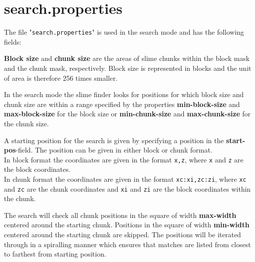 \documentclass[12pt]{article}
\begin{document}
\pagebreak
\section{\textbf{search.properties}}
\label{search.properties}
The file "\texttt{search.properties}" is used in the search mode and has the following fields:

\hspace{1.0cm}

\textbf{Block size} and \textbf{chunk size} are the areas of slime chunks within the block mask and the chunk mask, respectively. Block size is represented in blocks and the unit of area is therefore 256 times smaller.

In the search mode the slime finder looks for positions for which block size and chunk size are within a range specified by the properties \textbf{min-block-size} and \textbf{max-block-size} for the block size or \textbf{min-chunk-size} and \textbf{max-chunk-size} for the chunk size.

A starting position for the search is given by specifying a position in the \textbf{start-pos}-field. The position can be given in either block or chunk format. \\
In block format the coordinates are given in the format \texttt{x,z}, where \texttt{x} and \texttt{z} are the block coordinates. \\
In chunk format the coordinates are given in the format \texttt{xc:xi,zc:zi}, where \texttt{xc} and \texttt{zc} are the chunk coordinates and \texttt{xi} and \texttt{zi} are the block coordinates within the chunk.

The search will check all chunk positions in the square of width \textbf{max-width} centered around the starting chunk. Positions in the square of width \textbf{min-width} centered around the starting chunk are skipped.
The positions will be iterated through in a spiralling manner which ensures that matches are listed from closest to farthest from starting position.
\end{document}
